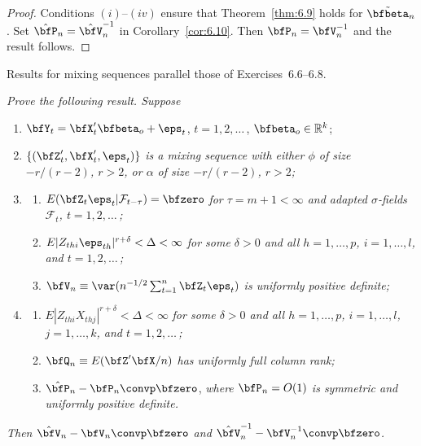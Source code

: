 \begin{proof}
Conditions $(i)$--$(iv)$ ensure that Theorem~\ref{thm:6.9} holds for $\tilde{\bfbeta}_n$. Set $\hat{\bfP}_n = \hat{\bfV}_n^{-1}$ in Corollary~\ref{cor:6.10}. Then $\bfP_n = \bfV_n^{-1}$ and the result follows.
\end{proof}

Results for mixing sequences parallel those of Exercises~6.6--6.8.

\begin{exercises}
\item\label{ex:6.12} \textit{Prove the following result. Suppose}
\begin{enumerate}[label=(\roman*)]
  \item $\bfY_t = \bfX_t'\bfbeta_o + \eps_t$, \quad $t = 1,2,\ldots$\,, \quad $\bfbeta_o \in \mathbb{R}^k$;
  \item $\{(\bfZ_t',\bfX_t',\eps_t)\}$ \textit{is a mixing sequence with either $\phi$ of size $-r/(r-2)$, $r>2$, or $\alpha$ of size $-r/(r-2)$, $r>2$;}
  \item\begin{enumerate}[label=(\alph*)]
    \item $E(\bfZ_t\eps_t|\mathcal{F}_{t-\tau}) = \bfzero$ \textit{for $\tau = m+1 < \infty$ and adapted $\sigma$-fields $\mathcal{F}_t$, $t = 1,2,\ldots$\,;}
    \item $E|Z_{thi}\eps_{th}|^{r+\delta} < \Delta < \infty$ \textit{for some $\delta > 0$ and all $h = 1,\ldots,p$, $i = 1,\ldots,l$, and $t = 1,2,\ldots$\,;}
    \item $\bfV_n \equiv \var(n^{-1/2}\sum_{t=1}^{n}\bfZ_t\eps_t)$ \textit{is uniformly positive definite;}
  \end{enumerate}
  \item\begin{enumerate}[label=(\alph*)]
    \item $E|Z_{thi}X_{thj}|^{r+\delta} < \Delta < \infty$ \textit{for some $\delta > 0$ and all $h = 1,\ldots,p$, $i = 1,\ldots,l$, $j = 1,\ldots,k$, and $t = 1,2,\ldots$\,;}
    \item $\bfQ_n \equiv E(\bfZ'\bfX/n)$ \textit{has uniformly full column rank;}
    \item $\hat{\bfP}_n - \bfP_n \convp \bfzero$, \textit{where $\bfP_n = O(1)$ is symmetric and uniformly positive definite.}
  \end{enumerate}
\end{enumerate}
\textit{Then $\hat{\bfV}_n - \bfV_n \convp \bfzero$ and $\hat{\bfV}_n^{-1} - \bfV_n^{-1} \convp \bfzero$.}


\end{exercises}
